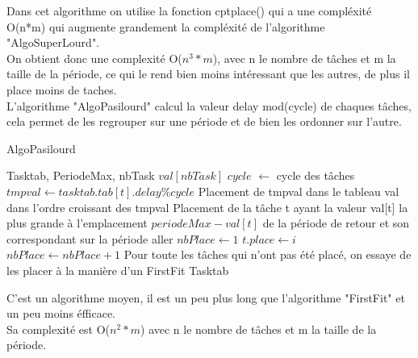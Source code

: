 \documentclass[11pt]{article}
\begin{document}
Dans cet algorithme on utilise la fonction cptplace() qui a une compléxité O(n*m) qui augmente grandement la compléxité de l'algorithme "AlgoSuperLourd".\\
On obtient donc une complexité O($n^3*m$), avec n le nombre de tâches et m la taille de la période, ce qui le rend bien moins intéressant que les autres, de plus il place moins de taches.\\

\newpage
L'algorithme "AlgoPasilourd" calcul la valeur delay mod(cycle) de chaques tâches, cela permet de les regrouper sur une période et de bien les ordonner sur l'autre.\\
\begin{algorithm}
    \caption{AlgoPasilourd}
    \begin{algorithmic}
    \REQUIRE Tasktab, PeriodeMax, nbTask
    \STATE $val[nbTask]$
    \STATE $cycle$ $\leftarrow$ cycle des tâches
        \STATE $tmpval \leftarrow tasktab.tab[t].delay\%cycle$
        \STATE Placement de tmpval dans le tableau val dans l'ordre croissant des tmpval
    \ENDFOR
    \STATE Placement de la tâche t ayant la valeur val[t] la plus grande à l'emplacement $periodeMax - val[t]$ de la période de retour et son correspondant sur la période aller
    \STATE $nbPlace \leftarrow 1$
                        \STATE $t.place \leftarrow i$
                    \ENDIF
                \ENDFOR
                \STATE $nbPlace \leftarrow nbPlace+1$
            \ENDIF
        \ENDFOR
    \ENDFOR
    \STATE Pour toute les tâches qui n'ont pas été placé, on essaye de les placer à la manière d'un FirstFit
    \RETURN Tasktab
    \end{algorithmic}
\end{algorithm}

C'est un algorithme moyen, il est un peu plus long que l'algorithme "FirstFit" et un peu moins éfficace.\\
Sa complexité est O($n^2*m$) avec n le nombre de tâches et m la taille de la période.\\ 
\end{document}
